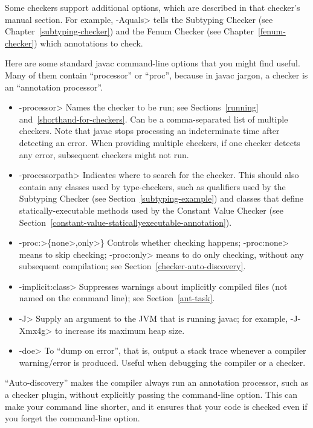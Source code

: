 \noindent
Some checkers support additional options, which are described in that
checker's manual section.
For example, \<-Aquals> tells
the Subtyping Checker (see Chapter~\ref{subtyping-checker}) and the Fenum Checker
(see Chapter~\ref{fenum-checker}) which annotations to check.


Here are some standard javac command-line options that you might find useful.
Many of them contain ``processor'' or ``proc'', because in javac jargon, a
checker is an ``annotation processor''.

\begin{itemize}
\item \<-processor> Names the checker to be
  run; see Sections~\ref{running} and~\ref{shorthand-for-checkers}.
  Can be a comma-separated list of multiple checkers.  Note that javac
  stops processing an indeterminate time after detecting an error.  When
  providing multiple checkers, if one checker detects any error, subsequent
  checkers might not run.
\item \<-processorpath> Indicates where to search for the
  checker.  This should also contain any classes used by type-checkers,
  such as qualifiers used by the Subtyping Checker (see
  Section~\ref{subtyping-example}) and classes that define
  statically-executable methods used by the Constant Value Checker (see
  Section~\ref{constant-value-staticallyexecutable-annotation}).
\item \<-proc:>\{\<none>,\<only>\} Controls whether checking
  happens; \<-proc:none>
  means to skip checking; \<-proc:only> means to do only
  checking, without any subsequent compilation; see
  Section~\ref{checker-auto-discovery}.
\item \<-implicit:class> Suppresses warnings about implicitly compiled files
  (not named on the command line); see Section~\ref{ant-task}.
\item \<-J> Supply an argument to the JVM that is running javac;
  for example, \<-J-Xmx4g> to increase its maximum heap size.
\item \<-doe> To ``dump on error'', that is, output a stack trace
  whenever a compiler warning/error is produced. Useful when debugging
  the compiler or a checker.
\end{itemize}



``Auto-discovery'' makes the  compiler always run an
annotation processor, such as a checker
plugin, without explicitly passing the 
command-line option.  This can make your command line shorter, and it ensures
that your code is checked even if you forget the command-line option.

